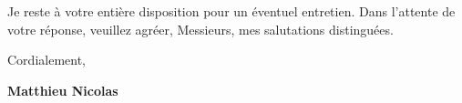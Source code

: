 \documentclass[11pt,a4paper,sans]{moderncv}        %
\newcommand{\tab}{\quad \quad}
\begin{document}

\tab Je reste à votre entière disposition pour un éventuel entretien. Dans l'attente de votre réponse, veuillez agréer, Messieurs, mes salutations distinguées.


Cordialement,\\
\begin{flushright}
\textbf{Matthieu Nicolas}
\end{flushright}
\end{document}
